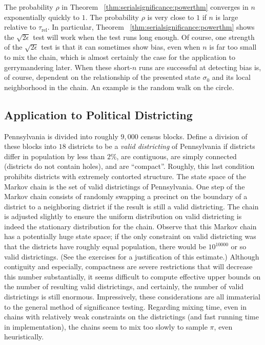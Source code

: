 \documentclass[12pt]{article}
\begin{document}
\begin{example}
\begin{remark}
    The probability \( \rho \) in Theorem~%
    \ref{thm:serialsignificance:powerthm} converges in \( n \)
    exponentially quickly to \( 1 \).  The probability \( \rho \) is
    very close to \( 1 \) if \( n \) is large relative to \( \tau_{\text
    {rel}} \).  In particular, Theorem~%
    \ref{thm:serialsignificance:powerthm} shows the \( \sqrt{2\epsilon} \)
    test will work when the test runs long enough.  Of course, one
    strength of the \( \sqrt{2\epsilon} \) test is that it can sometimes
    show bias, even when \( n \) is far too small to mix the chain,
    which is almost certainly the case for the application to
    gerrymandering later.  When these short-\( n \) runs are successful
    at detecting bias is, of course, dependent on the relationship of
    the presented state \( \sigma_0 \) and its local neighborhood in the
    chain.  An example is the random walk on the circle.
\end{remark}

\subsection*{Application to Political Districting}

Pennsylvania is divided into roughly \( 9,000 \) census blocks.  Define
a division of these blocks into \( 18 \) districts to be a \emph{valid
districting} of Pennsylvania if districts differ in population by less
than \( 2\% \), are contiguous, are simply connected (districts do not
contain holes), and are ``compact''.  Roughly, this last condition
prohibits districts with extremely contorted structure.  The state space
of the Markov chain is the set of valid districtings of Pennsylvania.
One step of the Markov chain consists of randomly swapping a precinct on
the boundary of a district to a neighboring district if the result is
still a valid districting.  The chain is adjusted slightly to ensure the
uniform distribution on valid districting is indeed the stationary
distribution for the chain.  Observe that this Markov chain has a
potentially huge state space; if the only constraint on valid
districting was that the districts have roughly equal population, there
would be \( 10^{10000} \) or so valid districtings.  (See the exercises
for a justification of this estimate.) Although contiguity and
especially, compactness are severe restrictions that will decrease this
number substantially, it seems difficult to compute effective upper
bounds on the number of resulting valid districtings, and certainly, the
number of valid districtings is still enormous.  Impressively, these
considerations are all immaterial to the general method of significance
testing.  Regarding mixing time, even in chains with relatively weak
constraints on the districtings (and fast running time in implementation),
the chains seem to mix too slowly to sample \( \pi \), even
heuristically.


\end{example}
\end{document}
